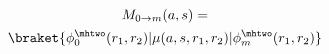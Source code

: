 %
%

\begin{multline}
  M_{0 \rightarrow m}(a, s) = \\
  	\braket{\phi^{\mhtwo}_{0}(r_1, r_2) | \mu(a, s, r_1, r_2) | \phi^{\mhtwo}_{m}(r_1, r_2)}
\label{eq:spec_tmoment}
\end{multline}

%